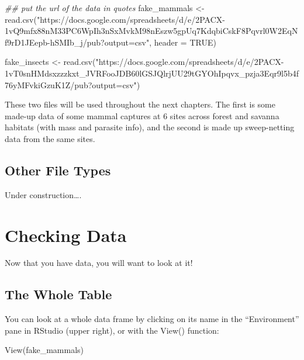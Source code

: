 \documentclass[
  letterpaper,
  DIV=11,
  numbers=noendperiod]{scrreprt}
\newenvironment{Shaded}{\begin{snugshade}}{\end{snugshade}}
\newcommand{\AttributeTok}[1]{\textcolor[rgb]{0.40,0.45,0.13}{#1}}
\newcommand{\ConstantTok}[1]{\textcolor[rgb]{0.56,0.35,0.01}{#1}}
\newcommand{\DocumentationTok}[1]{\textcolor[rgb]{0.37,0.37,0.37}{\textit{#1}}}
\newcommand{\FunctionTok}[1]{\textcolor[rgb]{0.28,0.35,0.67}{#1}}
\newcommand{\NormalTok}[1]{\textcolor[rgb]{0.00,0.23,0.31}{#1}}
\newcommand{\OtherTok}[1]{\textcolor[rgb]{0.00,0.23,0.31}{#1}}
\newcommand{\StringTok}[1]{\textcolor[rgb]{0.13,0.47,0.30}{#1}}
\begin{document}
\begin{Shaded}
\begin{Highlighting}[]
\DocumentationTok{\#\# put the url of the data in quotes}
\NormalTok{fake\_mammals }\OtherTok{\textless{}{-}} \FunctionTok{read.csv}\NormalTok{(}\StringTok{"https://docs.google.com/spreadsheets/d/e/2PACX{-}1vQ9mfx88nM33PC6WpIh3nSxMvkM98nEszw5gpUq7KdqbiCskF8Pqvrl0W2EqNf9rD1JEepb{-}hSMIb\_j/pub?output=csv"}\NormalTok{, }\AttributeTok{header =} \ConstantTok{TRUE}\NormalTok{)}

\NormalTok{fake\_insects }\OtherTok{\textless{}{-}} \FunctionTok{read.csv}\NormalTok{(}\StringTok{"https://docs.google.com/spreadsheets/d/e/2PACX{-}1vT0snHMdsxzzzkxt\_JVRFooJDB60lGSJQlrjUU29tGYOhIpqvx\_pzja3Eqr9l5b4f76yMFvkiGzuK1Z/pub?output=csv"}\NormalTok{)}
\end{Highlighting}
\end{Shaded}

These two files will be used throughout the next chapters. The first is
some made-up data of some mammal captures at 6 sites across forest and
savanna habitats (with mass and parasite info), and the second is made
up sweep-netting data from the same sites.

\subsection{Other File Types}\label{other-file-types}

Under construction\ldots.

\section{Checking Data}\label{checking-data}

Now that you have data, you will want to look at it!

\subsection{The Whole Table}\label{the-whole-table}

You can look at a whole data frame by clicking on its name in the
``Environment'' pane in RStudio (upper right), or with the View()
function:

\begin{Shaded}
\begin{Highlighting}[]
\FunctionTok{View}\NormalTok{(fake\_mammals)}
\end{Highlighting}
\end{Shaded}
\end{document}
